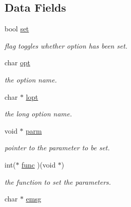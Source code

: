\subsection*{Data Fields}
\begin{DoxyCompactItemize}
\item 
\hypertarget{classflag__t_ad67f340df82fffbea1eef157ea00b6aa}{bool \hyperlink{classflag__t_ad67f340df82fffbea1eef157ea00b6aa}{set}}\label{classflag__t_ad67f340df82fffbea1eef157ea00b6aa}

\begin{DoxyCompactList}\small\item\em flag toggles whether option has been set. \end{DoxyCompactList}\item 
\hypertarget{classflag__t_abc7a5e5c09a1663833b54aea8df934d4}{char \hyperlink{classflag__t_abc7a5e5c09a1663833b54aea8df934d4}{opt}}\label{classflag__t_abc7a5e5c09a1663833b54aea8df934d4}

\begin{DoxyCompactList}\small\item\em the option name. \end{DoxyCompactList}\item 
\hypertarget{classflag__t_a28ca5f17d5c1765288359b060e1ef0f6}{char $\ast$ \hyperlink{classflag__t_a28ca5f17d5c1765288359b060e1ef0f6}{lopt}}\label{classflag__t_a28ca5f17d5c1765288359b060e1ef0f6}

\begin{DoxyCompactList}\small\item\em the long option name. \end{DoxyCompactList}\item 
\hypertarget{classflag__t_a5c61b009bf1d18cef797fd54291136fb}{void $\ast$ \hyperlink{classflag__t_a5c61b009bf1d18cef797fd54291136fb}{parm}}\label{classflag__t_a5c61b009bf1d18cef797fd54291136fb}

\begin{DoxyCompactList}\small\item\em pointer to the parameter to be set. \end{DoxyCompactList}\item 
\hypertarget{classflag__t_a0df7aa844332aebaf5ccb68d889cd584}{int($\ast$ \hyperlink{classflag__t_a0df7aa844332aebaf5ccb68d889cd584}{func} )(void $\ast$)}\label{classflag__t_a0df7aa844332aebaf5ccb68d889cd584}

\begin{DoxyCompactList}\small\item\em the function to set the parameters. \end{DoxyCompactList}\item 
\hypertarget{classflag__t_ad1efcb645ef5b3c0bf958c11b3867cb1}{char $\ast$ \hyperlink{classflag__t_ad1efcb645ef5b3c0bf958c11b3867cb1}{emsg}}\label{classflag__t_ad1efcb645ef5b3c0bf958c11b3867cb1}


\end{DoxyCompactItemize}
